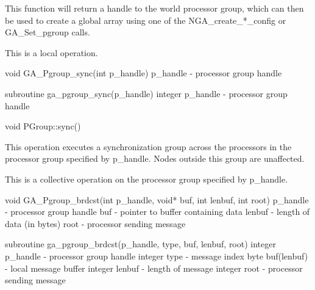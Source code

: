 \documentclass[12pt]{article}
\begin{document}
\begin{desc}

This function will return a handle to the world processor group, which can then be used to create a global array using one of the NGA_create_*_config or GA_Set_pgroup calls.

This is a local operation.
\end{desc}


\begin{capi}
void GA_Pgroup_sync(int p_handle)
   p_handle                     -  processor group handle                  \access{[input]} 
\end{capi}

\begin{fapi}
subroutine ga_pgroup_sync(p_handle)
   integer p_handle             - processor group handle                  \access{[input]} 
\end{fapi}

\begin{cxxapi}
void PGroup::sync()
\end{cxxapi}

\begin{desc}

This operation executes a synchronization group across the processors in the processor group specified by p_handle. Nodes outside this group are unaffected.

This is a collective operation on the processor group specified by p_handle. 
\end{desc}


\begin{capi}
void GA_Pgroup_brdcst(int p_handle, void* buf, int lenbuf, int root)
   p_handle                      - processor group handle                  \access{[input]} 
   buf                           - pointer to buffer containing data        
   lenbuf                        - length of data (in bytes)               \access{[input]} 
   root                          - processor sending message               \access{[input]} 
\end{capi}

\begin{fapi}
subroutine ga_pgroup_brdcst(p_handle, type, buf, lenbuf, root)
   integer p_handle              - processor group handle                  \access{[input]} 
   integer type                  - message index                           \access{[input]} 
   byte buf(lenbuf)              - local message buffer                     
   integer lenbuf                - length of message                       \access{[input]} 
   integer root                  - processor sending message               \access{[input]} 
\end{fapi}
\end{document}
